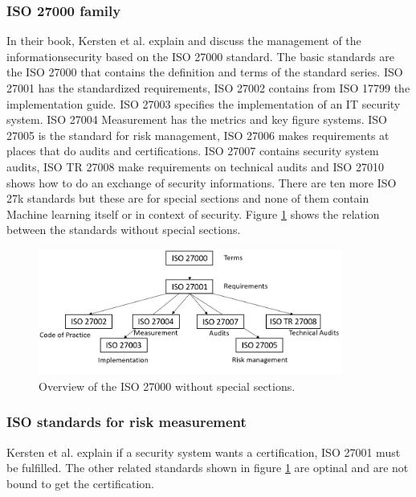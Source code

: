\subsubsection*{ISO 27000 family}

In their book, Kersten et al. \cite{kersten_reuter_schroeder_wolfenstetter_2013} explain and discuss the management of the informationsecurity based on the ISO 27000 standard. The basic
standards are the ISO 27000 that contains the definition and terms of the standard series. ISO 27001 has the standardized requirements, ISO 27002 contains from ISO 17799 the
implementation guide. ISO 27003 specifies the implementation of an IT security system. ISO 27004 Measurement has the metrics and key figure systems. ISO 27005 is the standard for risk
management, ISO 27006 makes requirements at places that do audits and certifications. ISO 27007 contains security system audits, ISO TR 27008 make requirements on technical audits and ISO
27010 shows how to do an exchange of security informations. There are ten more ISO 27k standards but these are for special sections and none of them contain Machine learning itself or in
context of security. Figure \ref{fig:standard_relations} shows
the relation between the standards without special sections.

\begin{figure}[ht!]
  \centering
  \includegraphics[width=10cm]{pictures/standard_relations.jpg}
  \caption{Overview of the ISO 27000 without special sections.}
  \label{fig:standard_relations}
\end{figure}


\subsubsection*{ISO standards for risk measurement}

Kersten et al. explain if a security system wants a certification, ISO 27001 must be fulfilled. The other related standards shown in figure \ref{fig:standard_relations} are optinal and are not bound to get the certification. \\


